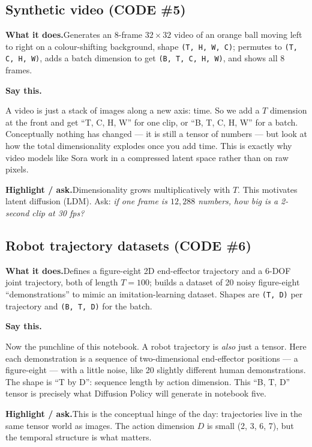 \documentclass[11pt]{article}
\newenvironment{saythis}{%
  \par\smallskip\noindent
  \begin{list}{}{%
    \setlength{\leftmargin}{1.2em}%
    \setlength{\rightmargin}{0.5em}%
    \setlength{\topsep}{2pt}%
  }\item\relax
  \color{sayrule}\textbf{Say this.}\hspace{0.4em}\color{black}\itshape
}{%
  \end{list}\par\smallskip
}
\newcommand{\highlight}[1]{\par\smallskip\noindent\textcolor{hlcolor}{\textbf{Highlight / ask.}}\hspace{0.4em}#1\par\smallskip}
\newcommand{\whatdoes}[1]{\par\noindent\textbf{What it does.}\hspace{0.4em}#1\par}
\begin{document}
\subsection{Synthetic video (CODE \#5)}
\whatdoes{Generates an 8-frame $32\times32$ video of an orange ball moving left to right on a colour-shifting
background, shape \texttt{(T, H, W, C)}; permutes to \texttt{(T, C, H, W)}, adds a batch dimension to get
\texttt{(B, T, C, H, W)}, and shows all 8 frames.}
\begin{saythis}
A video is just a stack of images along a new axis: time. So we add a $T$ dimension at the front and
get ``T, C, H, W'' for one clip, or ``B, T, C, H, W'' for a batch. Conceptually nothing has changed ---
it is still a tensor of numbers --- but look at how the total dimensionality explodes once you add
time. This is exactly why video models like Sora work in a compressed latent space rather than on raw
pixels.
\end{saythis}
\highlight{Dimensionality grows multiplicatively with $T$. This motivates latent diffusion (LDM).
Ask: \emph{if one frame is $12{,}288$ numbers, how big is a 2-second clip at 30 fps?}}

\subsection{Robot trajectory datasets (CODE \#6)}
\whatdoes{Defines a figure-eight 2D end-effector trajectory and a 6-DOF joint trajectory, both of length
$T=100$; builds a dataset of 20 noisy figure-eight ``demonstrations'' to mimic an imitation-learning
dataset. Shapes are \texttt{(T, D)} per trajectory and \texttt{(B, T, D)} for the batch.}
\begin{saythis}
Now the punchline of this notebook. A robot trajectory is \emph{also} just a tensor. Here each
demonstration is a sequence of two-dimensional end-effector positions --- a figure-eight ---
with a little noise, like 20 slightly different human demonstrations. The shape is ``T by D'':
sequence length by action dimension. This ``B, T, D'' tensor is precisely what Diffusion Policy will
generate in notebook five.
\end{saythis}
\highlight{This is the conceptual hinge of the day: trajectories live in the same tensor world as
images. The action dimension $D$ is small (2, 3, 6, 7), but the temporal structure is what matters.}
\end{document}

